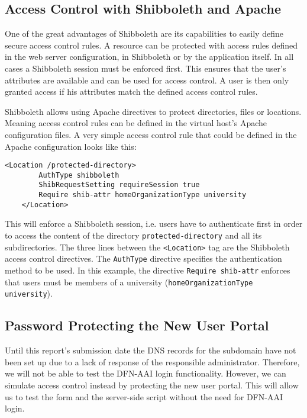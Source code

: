 \subsection{Access Control with Shibboleth and Apache}
One of the great advantages of Shibboleth are its capabilities to easily define
secure access control rules. A resource can be protected with access rules
defined in the web server configuration, in Shibboleth or by the application
itself. In all cases a Shibboleth session must be enforced first. This ensures
that the user's attributes are available and can be used for access control. A
user is then only granted access if his attributes match the defined access
control rules. 

Shibboleth allows using Apache directives to protect directories, files or
locations. Meaning access control rules can be defined in the virtual host's
Apache configuration files. A very simple access control rule that could be
defined in the Apache configuration looks like this: 

\begin{lstlisting}[frame=single]
    <Location /protected-directory>
        AuthType shibboleth
        ShibRequestSetting requireSession true
        Require shib-attr homeOrganizationType university
    </Location>
\end{lstlisting}

This will enforce a Shibboleth session, i.e. users have to authenticate first in
order to access the content of the directory \texttt{protected-directory} and
all its subdirectories. The three lines between the \texttt{<Location>} tag are
the Shibboleth access control directives. The \texttt{AuthType} directive
specifies the authentication method to be used. In this example, the directive
\texttt{Require shib-attr} enforces that users must be members of a university
(\texttt{homeOrganizationType university}).

\subsection{Password Protecting the New User Portal}

Until this report's submission date the DNS records for the subdomain have not
been set up due to a lack of response of the responsible administrator.
Therefore, we will not be able to test the DFN-AAI login functionality. However,
we can simulate access control instead by protecting the new user portal. This
will allow us to test the form and the server-side script without the need for
DFN-AAI login.

